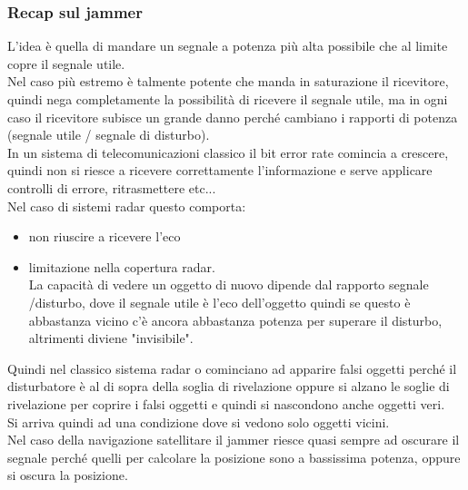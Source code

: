 \documentclass[oneside, 12pt]{extbook}
\begin{document}
\subsubsection{Recap sul jammer}
L'idea è quella di mandare un segnale a potenza più alta possibile che al limite copre il segnale utile.\\
Nel caso più estremo è talmente potente che manda in saturazione il ricevitore, quindi nega completamente la possibilità di ricevere il segnale utile, ma in ogni caso il ricevitore subisce un grande danno perché cambiano i rapporti di potenza (segnale utile / segnale di disturbo).\\
In un sistema di telecomunicazioni classico il bit error rate comincia a crescere, quindi non si riesce a ricevere correttamente l'informazione e serve applicare controlli di errore, ritrasmettere etc...\\
Nel caso di sistemi radar questo comporta:
\begin{itemize}
	\item non riuscire a ricevere l'eco
	\item limitazione nella copertura radar.\\
	La capacità di vedere un oggetto di nuovo dipende dal rapporto segnale /disturbo, dove il segnale utile è l'eco dell'oggetto quindi se questo è abbastanza vicino c'è ancora abbastanza potenza per superare il disturbo, altrimenti diviene "invisibile".\\
\end{itemize}
Quindi nel classico sistema radar o cominciano ad apparire falsi oggetti perché il disturbatore è al di sopra della soglia di rivelazione oppure si alzano le soglie di rivelazione per coprire i falsi oggetti e quindi si nascondono anche oggetti veri.\\
Si arriva quindi ad una condizione dove si vedono solo oggetti vicini.\\
Nel caso della navigazione satellitare il jammer riesce quasi sempre ad oscurare il segnale perché quelli per calcolare la posizione sono a bassissima potenza, oppure si oscura la posizione.\\
\end{document}
